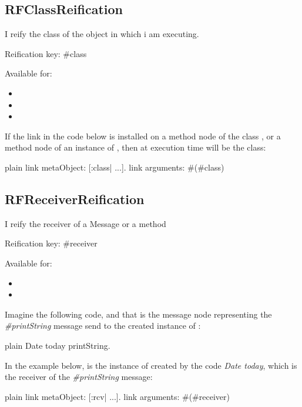 \documentclass[10pt,twoside,english]{_support/latex/sbabook/sbabook}
\begin{document}
\subsection{RFClassReification}
I reify the class of the object in which i am executing.

Reification key: \#class

Available for:

\begin{itemize}
\item {}
\item {}
\item {}
\end{itemize}

If the link in the code below is installed on a method node of the class , or a method node of an instance of , then at execution time  will be the  class:

\begin{displaycode}{plain}
link metaObject: [:class| ...].
link arguments: #(#class)
\end{displaycode}
\subsection{RFReceiverReification}
I reify the receiver of a Message or a method

Reification key: \#receiver

Available for:

\begin{itemize}
\item {}
\item {}
\end{itemize}

Imagine the following code, and that  is the message node representing the \textit{\#printString} message send to the created instance of :  

\begin{displaycode}{plain}
Date today printString.
\end{displaycode}

In the example below,  is the instance of  created by the code \textit{Date today}, which is the receiver of the \textit{\#printString} message:

\begin{displaycode}{plain}
link metaObject: [:rcv| ...].
link arguments: #(#receiver)
\end{displaycode}
\end{document}
